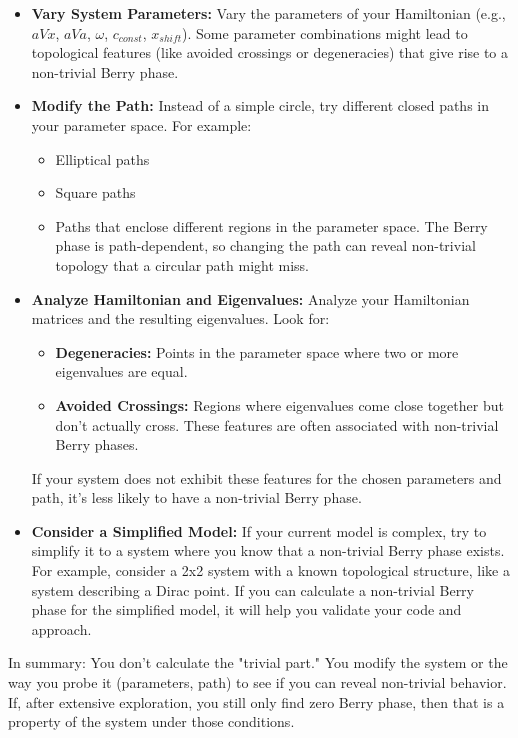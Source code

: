 \documentclass{article}
\begin{document}
\begin{itemize}
    \item   \textbf{Vary System Parameters:} Vary the parameters of your Hamiltonian (e.g., $aVx$, $aVa$, $\omega$, $c_{const}$, $x_{shift}$). Some parameter combinations might lead to topological features (like avoided crossings or degeneracies) that give rise to a non-trivial Berry phase.
    \item   \textbf{Modify the Path:} Instead of a simple circle, try different closed paths in your parameter space. For example:
        \begin{itemize}
            \item   Elliptical paths
            \item   Square paths
            \item   Paths that enclose different regions in the parameter space. The Berry phase is path-dependent, so changing the path can reveal non-trivial topology that a circular path might miss. \cite{nakahara2003}
        \end{itemize}

    \item   \textbf{Analyze Hamiltonian and Eigenvalues:} Analyze your Hamiltonian matrices and the resulting eigenvalues. Look for:
        \begin{itemize}
            \item   \textbf{Degeneracies:} Points in the parameter space where two or more eigenvalues are equal.
            \item   \textbf{Avoided Crossings:} Regions where eigenvalues come close together but don't actually cross. These features are often associated with non-trivial Berry phases. \cite{hatsugai2005}
        \end{itemize}
        If your system does not exhibit these features for the chosen parameters and path, it's less likely to have a non-trivial Berry phase.
    \item   \textbf{Consider a Simplified Model:} If your current model is complex, try to simplify it to a system where you know that a non-trivial Berry phase exists. For example, consider a 2x2 system with a known topological structure, like a system describing a Dirac point. If you can calculate a non-trivial Berry phase for the simplified model, it will help you validate your code and approach.
\end{itemize}

In summary: You don't calculate the "trivial part." You modify the system or the way you probe it (parameters, path) to see if you can reveal non-trivial behavior. If, after extensive exploration, you still only find zero Berry phase, then that is a property of the system under those conditions.
\end{document}
